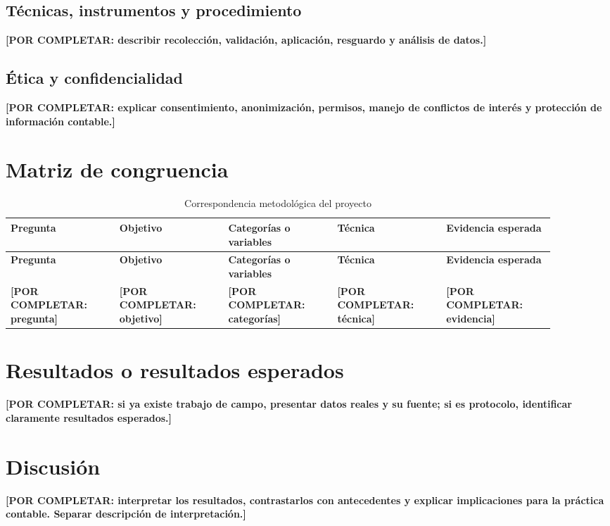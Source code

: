 \documentclass[spanish,letterpaper,oneside]{article}
\newcommand{\porcompletar}[1]{\textcolor{uasBlue}{\textbf{[POR COMPLETAR: #1]}}}
\begin{document}
\subsection{Técnicas, instrumentos y procedimiento}
\porcompletar{describir recolección, validación, aplicación, resguardo y análisis de datos.}

\subsection{Ética y confidencialidad}
\porcompletar{explicar consentimiento, anonimización, permisos, manejo de conflictos de interés y protección de información contable.}

\section{Matriz de congruencia}
\begingroup
\small
\setlength{\tabcolsep}{4pt}
\renewcommand{\arraystretch}{1.25}
\begin{longtable}{@{}p{0.18\linewidth}p{0.18\linewidth}p{0.18\linewidth}p{0.18\linewidth}p{0.18\linewidth}@{}}
\caption{Correspondencia metodológica del proyecto}\label{tab:congruencia}\\
\toprule
\textbf{Pregunta} & \textbf{Objetivo} & \textbf{Categorías o variables} & \textbf{Técnica} & \textbf{Evidencia esperada} \\
\midrule
\endfirsthead
\toprule
\textbf{Pregunta} & \textbf{Objetivo} & \textbf{Categorías o variables} & \textbf{Técnica} & \textbf{Evidencia esperada} \\
\midrule
\endhead
\bottomrule
\endlastfoot
\porcompletar{pregunta} & \porcompletar{objetivo} & \porcompletar{categorías} & \porcompletar{técnica} & \porcompletar{evidencia} \\
\end{longtable}
\endgroup

\section{Resultados o resultados esperados}
\porcompletar{si ya existe trabajo de campo, presentar datos reales y su fuente; si es protocolo, identificar claramente resultados esperados.}

\section{Discusión}
\porcompletar{interpretar los resultados, contrastarlos con antecedentes y explicar implicaciones para la práctica contable. Separar descripción de interpretación.}
\end{document}
